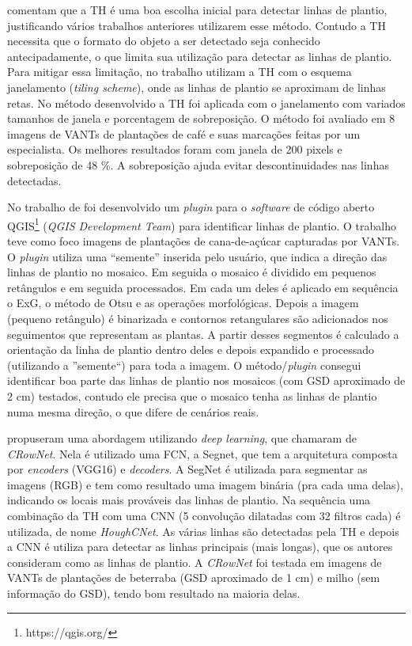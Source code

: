 \documentclass[12pt, a4paper, english, brazil]{article}
\newcommand{\dotsBlue}{\colorbox{orange}{\textcolor{blue}{\dots}}}
\begin{document}

 comentam que a TH é uma boa escolha inicial para detectar linhas de plantio, justificando vários trabalhos anteriores utilizarem esse método. Contudo a TH necessita que o formato do objeto a ser detectado seja conhecido antecipadamente, o que limita sua utilização para detectar as linhas de plantio. Para mitigar essa limitação, no trabalho utilizam a TH com o esquema janelamento (\textit{tiling scheme}), onde as linhas de plantio se aproximam de linhas retas. No método desenvolvido a TH foi aplicada com o janelamento com variados tamanhos de janela e porcentagem de sobreposição. O método foi avaliado em 8 imagens de VANTs de plantações de café e suas marcações feitas por um especialista. Os melhores resultados foram com janela de 200 pixels e sobreposição de 48 \%. A sobreposição ajuda evitar descontinuidades nas linhas detectadas.

No trabalho de  foi desenvolvido um \textit{plugin} para o \textit{software} de código aberto QGIS\footnote{https://qgis.org/} (\textit{QGIS Development Team}) para identificar linhas de plantio. O trabalho teve como foco imagens de plantações de cana-de-açúcar capturadas por VANTs. O \textit{plugin} utiliza uma ``semente'' inserida pelo usuário, que indica a direção das linhas de plantio no mosaico. Em seguida o mosaico é dividido em pequenos retângulos e em seguida processados. Em cada um deles é aplicado em sequência o ExG, o método de Otsu e as operações morfológicas. Depois a imagem (pequeno retângulo) é binarizada e contornos retangulares são adicionados nos seguimentos que representam as plantas. A partir desses segmentos é calculado a orientação da linha de plantio dentro deles e depois expandido e processado (utilizando a ''semente``) para toda a imagem. O método/\textit{plugin} consegui identificar boa parte das linhas de plantio nos mosaicos (com GSD aproximado de 2 cm) testados, contudo ele precisa que o mosaico tenha as linhas de plantio numa mesma direção, o que difere de cenários reais.

 propuseram uma abordagem utilizando \textit{deep learning}, que chamaram de  \textit{CRowNet}. Nela é utilizado uma FCN, a Segnet, que tem a arquitetura composta por \textit{encoders} (VGG16) e \textit{decoders}. A SegNet é utilizada para segmentar as imagens (RGB) e tem como resultado uma imagem binária (pra cada uma delas), indicando os locais mais prováveis das linhas de plantio. Na sequência uma combinação da TH com uma CNN (5 convolução dilatadas com 32 filtros cada) é utilizada, de nome \textit{HoughCNet}. As várias linhas são detectadas pela TH e depois a CNN é utiliza para detectar as linhas principais (mais longas), que os autores consideram como as linhas de plantio. A \textit{CRowNet} foi testada em imagens de VANTs de plantações de beterraba (GSD aproximado de 1 cm) e milho (sem informação do GSD), tendo bom resultado na maioria delas.
\end{document}
